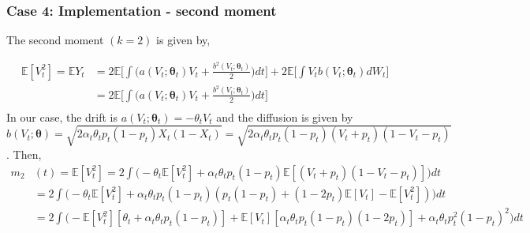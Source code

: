 \documentclass[aspectratio=169]{beamer}\usepackage[utf8]{inputenc}
\newcommand{\E}{\mathbb{E}}
\begin{document}
\begin{frame}\frametitle{ Case 4: Implementation - second moment }
The second moment $(k=2)$ is given by,

\begin{equation}
\begin{split}
\E [V_t^2] =  \E Y_t &= 2  \E\Big[ \int \Big( a (V_t; \bm{\theta}_t ) V_t  + \frac{b^2 (V_t; \bm{\theta}_t )}{2}  \Big) dt \Big] +  2 \E \Big[ \int V_t b (V_t; \bm{\theta}_t ) dW_t \Big]\\
&= 2  \E\Big[ \int \Big( a (V_t; \bm{\theta}_t ) V_t  + \frac{b^2 (V_t; \bm{\theta}_t )}{2}  \Big) dt \Big]\\
\end{split}
\end{equation}
In our case, the drift is $ a(V_t; \bm{\theta}_t) = - \theta_t V_t$ and the diffusion is given by $ b (V_t; \bm{\theta} )= \sqrt{ 2 \alpha_t \theta_t p_t (1-p_t)X_t (1-X_t)   } =  \sqrt{ 2 \alpha_t \theta_t p_t (1-p_t)(V_t + p_t) (1-V_t-p_t)   }$. Then,
\begin{equation*}
\begin{split}
m_{2}&(t)=\E [V_t^2] = 2  \int \Big( - \theta_t \E[V_t^2]  +  \alpha_t \theta_t p_t (1-p_t)\E[(V_t + p_t) (1-V_t-p_t) ] \Big) dt \\
&=2  \int \Big( - \theta_t \E[V_t^2]  +  \alpha_t \theta_t p_t (1-p_t)( p_t(1 - p_t) +(1-2p_t)\E[V_t] - \E[V_t^2] ) \Big) dt \\
&=2  \int \Big( -\E[V_t^2] [\theta_t + \alpha_t \theta_t p_t(1-p_t) ] + \E[V_t][\alpha_t \theta_t p_t (1-p_t) (1-2p_t)] + \alpha_t \theta_t p_t^2(1-p_t)^2 \Big) dt \\
\end{split}
\end{equation*}

\end{frame}
\end{document}
